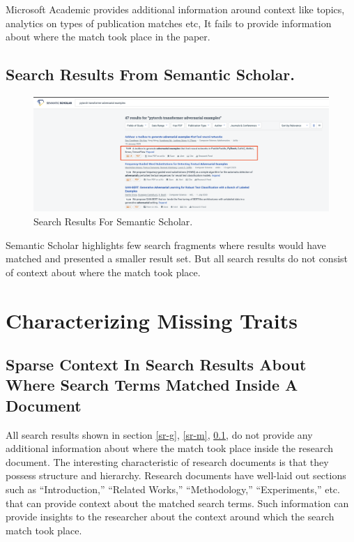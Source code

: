 Microsoft Academic provides additional information around context like topics, analytics on types of publication matches etc,
It fails to provide information about where the match took place in the paper.

\pagebreak
\subsection{Search Results From Semantic Scholar. }
\label{sr-s}
\begin{figure}[h]
    \centering
    \includegraphics[width=\maxwidth{\textwidth}]{src/images/ss-example.png}
    \caption{Search Results For Semantic Scholar. }
    \label{figure\arabic{figurecounter}}
\end{figure}
Semantic Scholar highlights few search fragments where results would have matched and presented a smaller result set. 
But all search results do not consist of context about where the match took place. 

\pagebreak
\section{Characterizing Missing Traits}
\label{section:intro:missing_traits}

\subsection{Sparse Context In Search Results About Where Search Terms Matched Inside A Document}

All search results shown in section \ref{sr-g}, \ref{sr-m}, \ref{sr-s}, do not provide any additional information about where the match took place inside the research document. The interesting characteristic of research documents is that they possess structure and hierarchy. Research documents have well-laid out sections such as “Introduction,” “Related Works,” “Methodology,” “Experiments,” etc. that can provide context about the matched search terms. Such information can provide insights to the researcher about the context around which the search match took place. 

